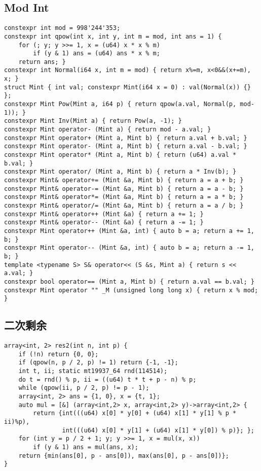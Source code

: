 \documentclass[a4paper,landscape,twocolumn]{ctexart}
\begin{document}
\subsection{Mod Int}

\begin{lstlisting}[]
constexpr int mod = 998'244'353;
constexpr int qpow(int x, int y, int m = mod, int ans = 1) {
	for (; y; y >>= 1, x = (u64) x * x % m)
		if (y & 1) ans = (u64) ans * x % m;
	return ans; }
constexpr int Normal(i64 x, int m = mod) { return x%=m, x<0&&(x+=m), x; }
struct Mint { int val; constexpr Mint(i64 x = 0) : val(Normal(x)) {} };
constexpr Mint Pow(Mint a, i64 p) { return qpow(a.val, Normal(p, mod-1)); }
constexpr Mint Inv(Mint a) { return Pow(a, -1); }
constexpr Mint operator- (Mint a) { return mod - a.val; }
constexpr Mint operator+ (Mint a, Mint b) { return a.val + b.val; }
constexpr Mint operator- (Mint a, Mint b) { return a.val - b.val; }
constexpr Mint operator* (Mint a, Mint b) { return (u64) a.val * b.val; }
constexpr Mint operator/ (Mint a, Mint b) { return a * Inv(b); }
constexpr Mint& operator+= (Mint &a, Mint b) { return a = a + b; }
constexpr Mint& operator-= (Mint &a, Mint b) { return a = a - b; }
constexpr Mint& operator*= (Mint &a, Mint b) { return a = a * b; }
constexpr Mint& operator/= (Mint &a, Mint b) { return a = a / b; }
constexpr Mint& operator++ (Mint &a) { return a += 1; }
constexpr Mint& operator-- (Mint &a) { return a -= 1; }
constexpr Mint operator++ (Mint &a, int) { auto b = a; return a += 1, b; }
constexpr Mint operator-- (Mint &a, int) { auto b = a; return a -= 1, b; }
template <typename S> S& operator<< (S &s, Mint a) { return s << a.val; }
constexpr bool operator== (Mint a, Mint b) { return a.val == b.val; }
constexpr Mint operator "" _M (unsigned long long x) { return x % mod; }
\end{lstlisting}

\subsection{二次剩余}

\begin{lstlisting}[]
array<int, 2> res2(int n, int p) {
	if (!n) return {0, 0};
	if (qpow(n, p / 2, p) != 1) return {-1, -1};
	int t, ii; static mt19937_64 rnd(114514);
	do t = rnd() % p, ii = ((u64) t * t + p - n) % p;
	while (qpow(ii, p / 2, p) != p - 1);
	array<int, 2> ans = {1, 0}, x = {t, 1};
	auto mul = [&] (array<int,2> x, array<int,2> y)->array<int,2> {
		return {int(((u64) x[0] * y[0] + (u64) x[1] * y[1] % p * ii)%p),
				int(((u64) x[0] * y[1] + (u64) x[1] * y[0]) % p)}; };
	for (int y = p / 2 + 1; y; y >>= 1, x = mul(x, x))
		if (y & 1) ans = mul(ans, x);
	return {min(ans[0], p - ans[0]), max(ans[0], p - ans[0])};
}
\end{lstlisting}
\end{document}
